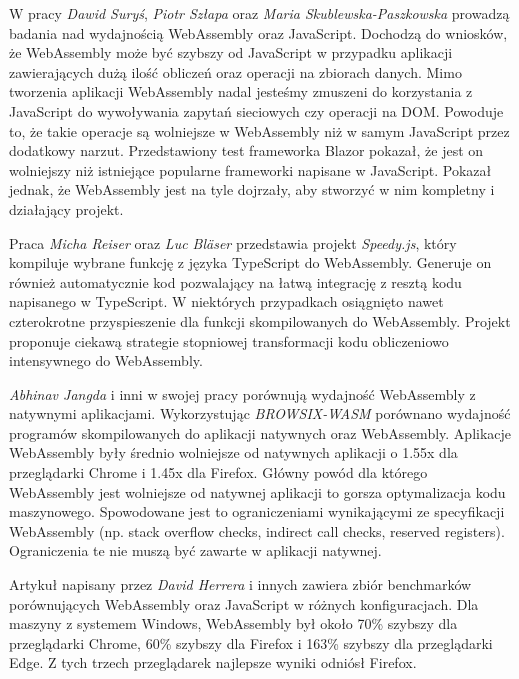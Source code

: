 \documentclass[language=polish,type=master]{aghmodern}
\begin{document}
W pracy \cite{wasm_blazor} \emph{Dawid Suryś}, \emph{Piotr Szłapa} oraz \emph{Maria Skublewska-Paszkowska} prowadzą badania nad wydajnością WebAssembly oraz JavaScript.
Dochodzą do wniosków, że WebAssembly może być szybszy od JavaScript w przypadku aplikacji zawierających dużą ilość obliczeń oraz operacji na zbiorach danych.
Mimo tworzenia aplikacji WebAssembly nadal jesteśmy zmuszeni do korzystania z JavaScript do wywoływania zapytań sieciowych czy operacji na DOM.
Powoduje to, że takie operacje są wolniejsze w WebAssembly niż w samym JavaScript przez dodatkowy narzut.
Przedstawiony test frameworka Blazor\footnotemark{} pokazał, że jest on wolniejszy niż istniejące popularne frameworki napisane w JavaScript.
Pokazał jednak, że WebAssembly jest na tyle dojrzały, aby stworzyć w nim kompletny i działający projekt.

Praca \cite{wasm_speedyjs} \emph{Micha Reiser} oraz \emph{Luc Bl\"{a}ser} przedstawia projekt \emph{Speedy.js}, który kompiluje wybrane funkcję z języka TypeScript\footnotemark{} do WebAssembly.
Generuje on również automatycznie kod pozwalający na łatwą integrację z resztą kodu napisanego w TypeScript.
W niektórych przypadkach osiągnięto nawet czterokrotne przyspieszenie dla funkcji skompilowanych do WebAssembly.
Projekt proponuje ciekawą strategie stopniowej transformacji kodu obliczeniowo intensywnego do WebAssembly.

\emph{Abhinav Jangda} i inni w swojej pracy \cite{wasm_native} porównują wydajność WebAssembly z natywnymi aplikacjami.
Wykorzystując \emph{BROWSIX-WASM}\footnotemark{} porównano wydajność programów skompilowanych do aplikacji natywnych oraz WebAssembly.
Aplikacje WebAssembly były średnio wolniejsze od natywnych aplikacji o 1.55x dla przeglądarki Chrome i 1.45x dla Firefox.
Główny powód dla którego WebAssembly jest wolniejsze od natywnej aplikacji to gorsza optymalizacja kodu maszynowego.
Spowodowane jest to ograniczeniami wynikającymi ze specyfikacji WebAssembly (np. stack overflow checks, indirect call checks, reserved registers).
Ograniczenia te nie muszą być zawarte w aplikacji natywnej.

Artykuł \cite{wasm_js_bench} napisany przez \emph{David Herrera} i innych zawiera zbiór benchmarków porównujących WebAssembly oraz JavaScript w różnych konfiguracjach.
Dla maszyny z systemem Windows, WebAssembly był około 70\% szybszy dla przeglądarki Chrome, 60\% szybszy dla Firefox i 163\% szybszy dla przeglądarki Edge.
Z tych trzech przeglądarek najlepsze wyniki odniósł Firefox.
\end{document}
